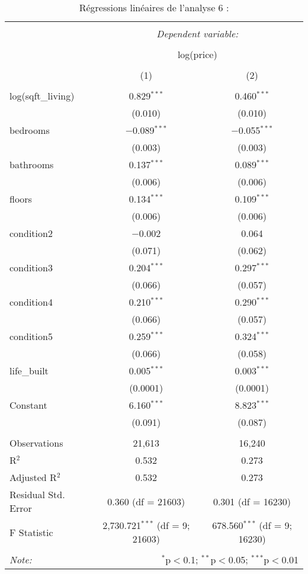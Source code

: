 \documentclass[
  11pt,
  french,
]{article}
\begin{document}
\begin{table}[!htbp] \centering 
  \caption{Régressions linéaires de l'analyse 6 :} 
  \label{} 
\small 
\begin{tabular}{@{\extracolsep{1pt}}lcc} 
\\[-1.8ex]\hline 
\hline \\[-1.8ex] 
 & \multicolumn{2}{c}{\textit{Dependent variable:}} \\ 
\cline{2-3} 
\\[-1.8ex] & \multicolumn{2}{c}{log(price)} \\ 
\\[-1.8ex] & (1) & (2)\\ 
\hline \\[-1.8ex] 
 log(sqft\_living) & 0.829$^{***}$ & 0.460$^{***}$ \\ 
  & (0.010) & (0.010) \\ 
  bedrooms & $-$0.089$^{***}$ & $-$0.055$^{***}$ \\ 
  & (0.003) & (0.003) \\ 
  bathrooms & 0.137$^{***}$ & 0.089$^{***}$ \\ 
  & (0.006) & (0.006) \\ 
  floors & 0.134$^{***}$ & 0.109$^{***}$ \\ 
  & (0.006) & (0.006) \\ 
  condition2 & $-$0.002 & 0.064 \\ 
  & (0.071) & (0.062) \\ 
  condition3 & 0.204$^{***}$ & 0.297$^{***}$ \\ 
  & (0.066) & (0.057) \\ 
  condition4 & 0.210$^{***}$ & 0.290$^{***}$ \\ 
  & (0.066) & (0.057) \\ 
  condition5 & 0.259$^{***}$ & 0.324$^{***}$ \\ 
  & (0.066) & (0.058) \\ 
  life\_built & 0.005$^{***}$ & 0.003$^{***}$ \\ 
  & (0.0001) & (0.0001) \\ 
  Constant & 6.160$^{***}$ & 8.823$^{***}$ \\ 
  & (0.091) & (0.087) \\ 
 \hline \\[-1.8ex] 
Observations & 21,613 & 16,240 \\ 
R$^{2}$ & 0.532 & 0.273 \\ 
Adjusted R$^{2}$ & 0.532 & 0.273 \\ 
Residual Std. Error & 0.360 (df = 21603) & 0.301 (df = 16230) \\ 
F Statistic & 2,730.721$^{***}$ (df = 9; 21603) & 678.560$^{***}$ (df = 9; 16230) \\ 
\hline 
\hline \\[-1.8ex] 
\textit{Note:}  & \multicolumn{2}{r}{$^{*}$p$<$0.1; $^{**}$p$<$0.05; $^{***}$p$<$0.01} \\ 
\end{tabular} 
\end{table}
\end{document}

